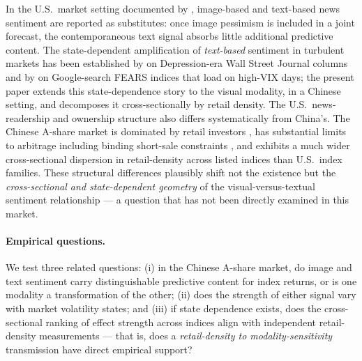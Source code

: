 \documentclass[AER]{AEA}
\begin{document}
In the U.S.\ market setting documented by \citet{obaid2022picture}, image-based and text-based news sentiment are reported as substitutes: once image pessimism is included in a joint forecast, the contemporaneous text signal absorbs little additional predictive content. The state-dependent amplification of \emph{text-based} sentiment in turbulent markets has been established by \citet{garcia2013sentiment} on Depression-era Wall Street Journal columns and by \citet{da2015fears} on Google-search FEARS indices that load on high-VIX days; the present paper extends this state-dependence story to the visual modality, in a Chinese setting, and decomposes it cross-sectionally by retail density. The U.S.\ news-readership and ownership structure also differs systematically from China's. The Chinese A-share market is dominated by retail investors \citep{liu2019size,jones2025retail}, has substantial limits to arbitrage including binding short-sale constraints \citep{stambaugh2012short,han2022chinese}, and exhibits a much wider cross-sectional dispersion in retail-density across listed indices than U.S.\ index families. These structural differences plausibly shift not the existence but the \emph{cross-sectional and state-dependent geometry} of the visual-versus-textual sentiment relationship --- a question that has not been directly examined in this market.

\paragraph{Empirical questions.} We test three related questions: (i) in the Chinese A-share market, do image and text sentiment carry distinguishable predictive content for index returns, or is one modality a transformation of the other; (ii) does the strength of either signal vary with market volatility states; and (iii) if state dependence exists, does the cross-sectional ranking of effect strength across indices align with independent retail-density measurements --- that is, does a \emph{retail-density to modality-sensitivity} transmission have direct empirical support?
\end{document}
